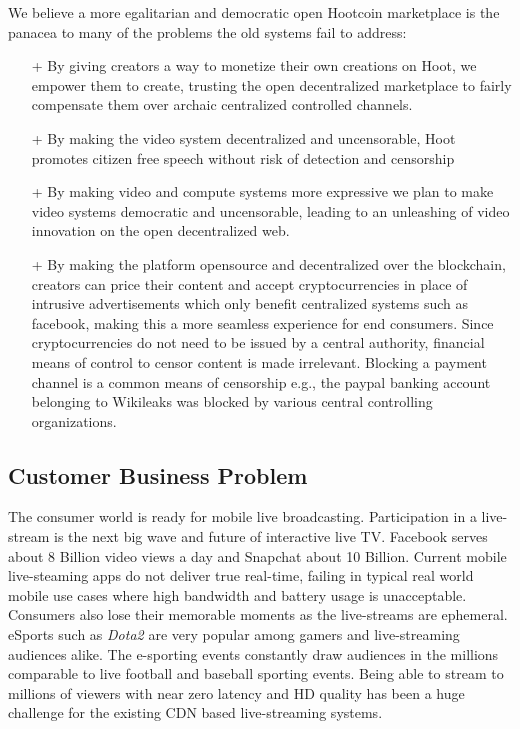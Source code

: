 \documentclass{article}
\begin{document}
We believe a more egalitarian and democratic open Hootcoin marketplace is the panacea to many of the problems the old systems fail to address:
\begin{itemize}
\item[+]By giving creators a way to monetize their own creations on Hoot, we empower them to create, trusting the open decentralized marketplace to fairly compensate them over archaic centralized controlled channels.
\item[+]By making the video system decentralized and uncensorable, Hoot promotes citizen free speech without risk of detection and censorship
\item[+]By making video and compute systems more expressive we plan to make video systems democratic and uncensorable, leading to an unleashing of video innovation on the open decentralized web.

\item[+]By making the platform opensource and decentralized over the blockchain, creators can price their content and accept cryptocurrencies in place of intrusive advertisements which only benefit centralized systems such as facebook, making this a more seamless experience for end consumers. Since cryptocurrencies do not need to be issued by a central authority, financial means of control to censor content is made irrelevant. Blocking a payment channel is a common means of censorship e.g., the paypal banking account belonging to Wikileaks was blocked by various central controlling organizations.
\end{itemize}


\subsection{Customer Business Problem}
The consumer world is ready for mobile live broadcasting. Participation in a live-stream is the next big wave and future of interactive live TV. Facebook serves about 8 Billion video views a day and Snapchat about 10 Billion. Current mobile live-steaming apps do not deliver true real-time, failing in typical real world mobile use cases where high bandwidth and battery usage is unacceptable. Consumers also lose their memorable moments as the live-streams are ephemeral. eSports such as \emph{Dota2} are very popular among gamers and live-streaming audiences alike. The e-sporting events constantly draw audiences in the millions comparable to live football and baseball sporting events. Being able to stream to millions of viewers with near zero latency and HD quality has been a huge challenge for the existing CDN based live-streaming systems.
\end{document}
